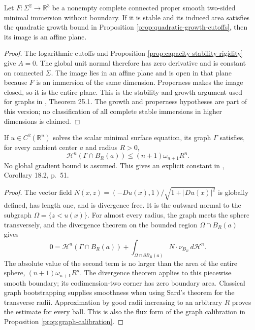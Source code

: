 \begin{theorem}\label{thm:stable-bernstein-quadratic}
Let $F:\Sigma^2\to\mathbb R^3$ be a nonempty complete connected proper smooth two-sided minimal immersion without boundary. If it is stable and its induced area satisfies the quadratic growth bound in Proposition \ref{prop:quadratic-growth-cutoffs}, then its image is an affine plane.
\end{theorem}
\begin{proof}
The logarithmic cutoffs and Proposition \ref{prop:capacity-stability-rigidity} give $A=0$. The global unit normal therefore has zero derivative and is constant on connected $\Sigma$. The image lies in an affine plane and is open in that plane because $F$ is an immersion of the same dimension. Properness makes the image closed, so it is the entire plane. This is the stability-and-growth argument used for graphs in \cite{ChMin}, Theorem 25.1. The growth and properness hypotheses are part of this version; no classification of all complete stable immersions in higher dimensions is claimed.
\end{proof}

\begin{proposition}\label{prop:entire-graph-area-growth}
If $u\in C^2(\mathbb R^n)$ solves the scalar minimal surface equation, its graph $\Gamma$ satisfies, for every ambient center $a$ and radius $R>0$,
\[
 \mathcal H^n(\Gamma\cap B_R(a))
 \leq(n+1)\omega_{n+1}R^n.
\]
No global gradient bound is assumed. This gives an explicit constant in \cite{ChMin}, Corollary 18.2, p.~51.
\end{proposition}
\begin{proof}
The vector field $N(x,z)=(-Du(x),1)/\sqrt{1+|Du(x)|^2}$ is globally defined, has length one, and is divergence free. It is the outward normal to the subgraph $\Omega=\{z<u(x)\}$. For almost every radius, the graph meets the sphere transversely, and the divergence theorem on the bounded region $\Omega\cap B_R(a)$ gives
\[
 0=\mathcal H^n(\Gamma\cap B_R(a))
 +\int_{\Omega\cap\partial B_R(a)}N\cdot\nu_{B_R}\,d\mathcal H^n.
\]
The absolute value of the second term is no larger than the area of the entire sphere, $(n+1)\omega_{n+1}R^n$. The divergence theorem applies to this piecewise smooth boundary; its codimension-two corner has zero boundary area. Classical graph bootstrapping supplies smoothness when using Sard's theorem for the transverse radii. Approximation by good radii increasing to an arbitrary $R$ proves the estimate for every ball. This is also the flux form of the graph calibration in Proposition \ref{prop:graph-calibration}.
\end{proof}

